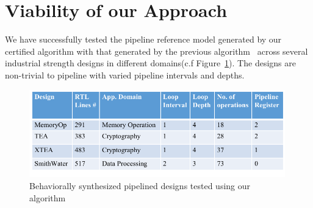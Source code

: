 \section{Viability of our Approach}
\label{sec:SEC}

We have successfully tested the pipeline reference model generated by our certified algorithm with that generated by the previous algorithm~\cite{kechengthesis} across several industrial strength designs in different domains(c.f Figure~\ref{fig:testing}). The designs are non-trivial to pipeline with varied pipeline intervals and depths.

\begin{figure}
\begin{center}
\includegraphics[height=1.5in]{fig-proposal/testing}
\end{center}
\caption{Behaviorally synthesized pipelined designs tested using our algorithm}
\label{fig:testing}
\end{figure}








